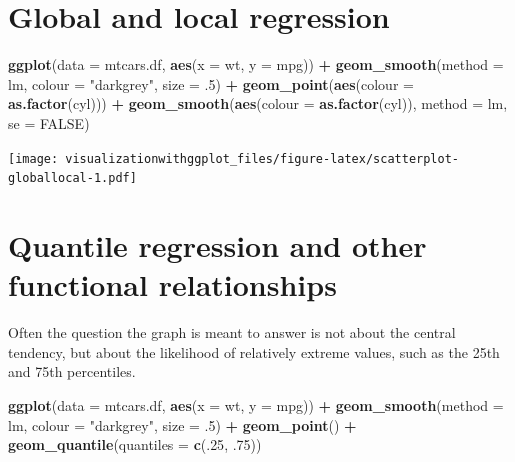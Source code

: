 \documentclass[]{krantz}
\makeatletter
\newenvironment{Shaded}{\begin{snugshade}}{\end{snugshade}}
\newcommand{\DataTypeTok}[1]{\textcolor[rgb]{0.13,0.29,0.53}{#1}}
\newcommand{\DecValTok}[1]{\textcolor[rgb]{0.00,0.00,0.81}{#1}}
\newcommand{\FloatTok}[1]{\textcolor[rgb]{0.00,0.00,0.81}{#1}}
\newcommand{\KeywordTok}[1]{\textcolor[rgb]{0.13,0.29,0.53}{\textbf{#1}}}
\newcommand{\NormalTok}[1]{#1}
\newcommand{\OperatorTok}[1]{\textcolor[rgb]{0.81,0.36,0.00}{\textbf{#1}}}
\newcommand{\OtherTok}[1]{\textcolor[rgb]{0.56,0.35,0.01}{#1}}
\newcommand{\StringTok}[1]{\textcolor[rgb]{0.31,0.60,0.02}{#1}}
\newenvironment{kframe}{%
\medskip{}
\setlength{\fboxsep}{.8em}
 \def\at@end@of@kframe{}%
 \ifinner\ifhmode%
  \def\at@end@of@kframe{\end{minipage}}%
  \begin{minipage}{\columnwidth}%
 \fi\fi%
 \def\FrameCommand##1{\hskip\@totalleftmargin \hskip-\fboxsep
 \colorbox{shadecolor}{##1}\hskip-\fboxsep
     \hskip-\linewidth \hskip-\@totalleftmargin \hskip\columnwidth}%
 \MakeFramed {\advance\hsize-\width
   \@totalleftmargin\z@ \linewidth\hsize
   \@setminipage}}%
 {\par\unskip\endMakeFramed%
 \at@end@of@kframe}
\renewenvironment{Shaded}{\begin{kframe}}{\end{kframe}}
\makeatother
\begin{document}
\hypertarget{global-and-local-regression}{%
\section{Global and local regression}\label{global-and-local-regression}}

\begin{Shaded}
\begin{Highlighting}[]
\KeywordTok{ggplot}\NormalTok{(}\DataTypeTok{data =}\NormalTok{ mtcars.df, }\KeywordTok{aes}\NormalTok{(}\DataTypeTok{x =}\NormalTok{ wt, }\DataTypeTok{y =}\NormalTok{ mpg)) }\OperatorTok{+}
\StringTok{  }\KeywordTok{geom_smooth}\NormalTok{(}\DataTypeTok{method =}\NormalTok{ lm, }\DataTypeTok{colour =} \StringTok{"darkgrey"}\NormalTok{, }\DataTypeTok{size =} \FloatTok{.5}\NormalTok{) }\OperatorTok{+}
\StringTok{  }\KeywordTok{geom_point}\NormalTok{(}\KeywordTok{aes}\NormalTok{(}\DataTypeTok{colour =} \KeywordTok{as.factor}\NormalTok{(cyl))) }\OperatorTok{+}
\StringTok{  }\KeywordTok{geom_smooth}\NormalTok{(}\KeywordTok{aes}\NormalTok{(}\DataTypeTok{colour =} \KeywordTok{as.factor}\NormalTok{(cyl)), }\DataTypeTok{method =}\NormalTok{ lm, }\DataTypeTok{se =} \OtherTok{FALSE}\NormalTok{)}
\end{Highlighting}
\end{Shaded}

\texttt{[image: visualizationwithggplot\_files/figure-latex/scatterplot-globallocal-1.pdf]}

\hypertarget{quantile-regression-and-other-functional-relationships}{%
\section{Quantile regression and other functional relationships}\label{quantile-regression-and-other-functional-relationships}}

Often the question the graph is meant to answer is not about the central tendency, but about the likelihood of relatively extreme values, such as the 25th and 75th percentiles.

\begin{Shaded}
\begin{Highlighting}[]
\KeywordTok{ggplot}\NormalTok{(}\DataTypeTok{data =}\NormalTok{ mtcars.df, }\KeywordTok{aes}\NormalTok{(}\DataTypeTok{x =}\NormalTok{ wt, }\DataTypeTok{y =}\NormalTok{ mpg)) }\OperatorTok{+}
\StringTok{    }\KeywordTok{geom_smooth}\NormalTok{(}\DataTypeTok{method =}\NormalTok{ lm, }\DataTypeTok{colour =} \StringTok{"darkgrey"}\NormalTok{, }\DataTypeTok{size =} \FloatTok{.5}\NormalTok{) }\OperatorTok{+}
\StringTok{  }\KeywordTok{geom_point}\NormalTok{() }\OperatorTok{+}
\StringTok{  }\KeywordTok{geom_quantile}\NormalTok{(}\DataTypeTok{quantiles =} \KeywordTok{c}\NormalTok{(.}\DecValTok{25}\NormalTok{, }\FloatTok{.75}\NormalTok{))}
\end{Highlighting}
\end{Shaded}
\end{document}

